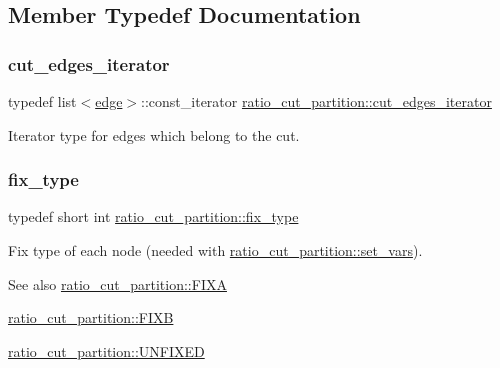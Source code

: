 \subsection{Member Typedef Documentation}
\mbox{\label{classratio__cut__partition_a5269af60e49810067411b085a1341adc}} 
\subsubsection{\texorpdfstring{cut\+\_\+edges\+\_\+iterator}{cut\_edges\_iterator}}
{\footnotesize\ttfamily typedef list$<$\mbox{\hyperlink{classedge}{edge}}$>$\+::const\+\_\+iterator \mbox{\hyperlink{classratio__cut__partition_a5269af60e49810067411b085a1341adc}{ratio\+\_\+cut\+\_\+partition\+::cut\+\_\+edges\+\_\+iterator}}}

Iterator type for edges which belong to the cut. \mbox{\label{classratio__cut__partition_a558dda40abda8ab03edb4605dbb81e36}} 
\subsubsection{\texorpdfstring{fix\+\_\+type}{fix\_type}}
{\footnotesize\ttfamily typedef short int \mbox{\hyperlink{classratio__cut__partition_a558dda40abda8ab03edb4605dbb81e36}{ratio\+\_\+cut\+\_\+partition\+::fix\+\_\+type}}}

Fix type of each node (needed with \mbox{\hyperlink{classratio__cut__partition_a4c143f82aac5fee3b955414ab7d6ce19}{ratio\+\_\+cut\+\_\+partition\+::set\+\_\+vars}}).

\begin{DoxySeeAlso}{See also}
\mbox{\hyperlink{classratio__cut__partition_a2fe155c63de19dc08c16bcb382f0dcbc}{ratio\+\_\+cut\+\_\+partition\+::\+F\+I\+XA}} 

\mbox{\hyperlink{classratio__cut__partition_aea621a2460229773cbc095814942963a}{ratio\+\_\+cut\+\_\+partition\+::\+F\+I\+XB}} 

\mbox{\hyperlink{classratio__cut__partition_a153cc7e51ac5d72a00671b6bdbcc6fa5}{ratio\+\_\+cut\+\_\+partition\+::\+U\+N\+F\+I\+X\+ED}} 
\end{DoxySeeAlso}
\mbox{\label{classratio__cut__partition_a4f667099b56ded1bfef8f1fb4d09f81c}} 
